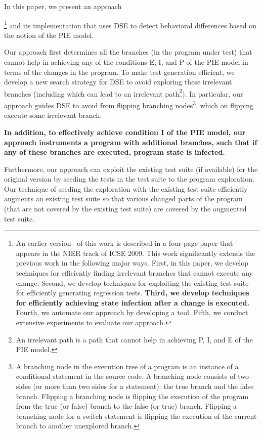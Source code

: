 In this paper, we present an approach{\footnote{\scriptsize{An earlier version~\cite{taneja09:guided} of this work is described in a four-page paper that appears in the NIER track of ICSE 2009. This
work significantly extends the previous work in the following major ways.
First, in this paper, we develop techniques for efficiently finding irrelevant branches 
that cannot execute any change. 
Second, we develop techniques for exploiting the existing test suite for efficiently generating regression tests.
\textbf{Third, we develop techniques for efficiently achieving state infection after a change is executed.}
Fourth, we automate our approach by developing a tool.
Fifth, we conduct extensive experiments to evaluate our approach.}}  and its implementation that uses DSE to detect behavioral differences based on the notion of the PIE model.

Our approach first determines all the branches (in the program under test) that cannot help in achieving any of the conditions E, I, and P of the PIE model in terms of the changes in the program. To make test generation efficient, we develop a new search strategy for DSE to avoid exploring these irrelevant branches (including which can lead to an irrelevant path\footnote{\scriptsize{An irrelevant path is a path that cannot help in achieving P, I, and E of the PIE model.}}). In particular, our approach guides DSE to avoid from flipping branching nodes\footnote{\scriptsize{A branching node in the execution tree of a program is an instance of a conditional statement in the source code. A branching node consists of two sides (or more than two sides for a  statement): the true branch and the false branch. Flipping a branching node is flipping the execution of the program from the true (or false) branch to the false (or true) branch. Flipping a branching node for a switch statement is flipping the execution of the current branch to another unexplored branch.}}, which on flipping execute some irrelevant branch. 

\textbf{
In addition, to effectively achieve condition I of the PIE model, our approach instruments a program with additional branches, 
such that if any of these branches are executed, program state is infected. 
}

Furthermore, our approach can exploit the existing test suite (if available) for the original version by seeding the tests in the test suite to the program exploration. Our technique of seeding the exploration with the existing test suite efficiently augments an existing test suite so that various changed parts of the program (that are not covered by the existing test suite) are covered by the augmented test suite. 

}
